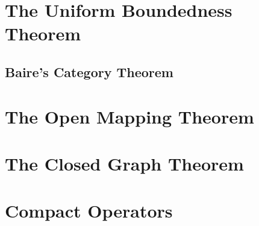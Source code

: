 \documentclass{article}
\begin{document}
\section{The Uniform Boundedness Theorem}
\subsection{Baire's Category Theorem}
\section{The Open Mapping Theorem}  

\section{The Closed Graph Theorem}  

\section{Compact Operators}
\end{document}
